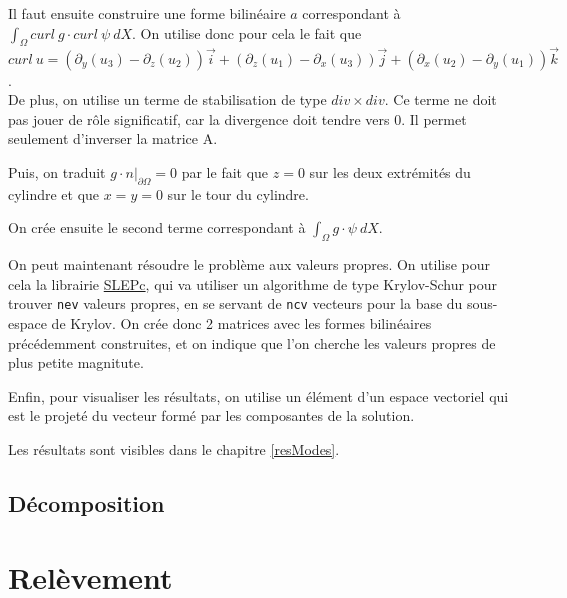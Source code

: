 Il faut ensuite construire une forme bilinéaire $a$ correspondant à $\int_\Omega curl\ g\cdot curl\ \psi\ dX$. On utilise donc pour cela le fait que $curl\ u = (\partial_y(u_3)-\partial_z(u_2))\vec{i} + (\partial_z(u_1) - \partial_x(u_3))\vec{j} + (\partial_x(u_2)-\partial_y(u_1))\vec{k}$.\\
De plus, on utilise un terme de stabilisation de type $div \times div$. Ce terme ne doit pas jouer de rôle significatif, car la divergence doit tendre vers 0. Il permet seulement d'inverser la matrice A.



Puis, on traduit $g\cdot n\big\rvert_{\partial\Omega}=0$ par le fait que $z=0$ sur les deux extrémités du cylindre et que $x=y=0$ sur le tour du cylindre.



On crée ensuite le second terme correspondant à $\int_\Omega g\cdot\psi\ dX$.



On peut maintenant résoudre le problème aux valeurs propres. On utilise pour cela la librairie \href{http://www.grycap.upv.es/slepc/}{SLEPc}, qui va utiliser un algorithme de type Krylov-Schur pour trouver \texttt{nev} valeurs propres, en se servant de \texttt{ncv} vecteurs pour la base du sous-espace de Krylov. On crée donc 2 matrices avec les formes bilinéaires précédemment construites, et on indique que l'on cherche les valeurs propres de plus petite magnitute.



Enfin, pour visualiser les résultats, on utilise un élément d'un espace vectoriel qui est le projeté du vecteur formé par les composantes de la solution.



Les résultats sont visibles dans le chapitre \ref{resModes}.

\subsection{Décomposition}

\section{Relèvement}

